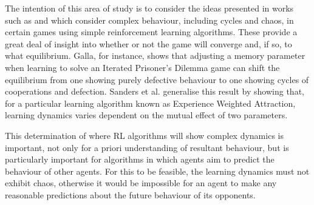 \documentclass[../sample.tex]{subfiles}
\begin{document}
    The intention of this area of study is to consider the ideas presented in works such as 
    \cite{Sanders2018} and \cite{Galla2011} which consider complex behaviour, including cycles and
    chaos, in certain games using simple reinforcement learning algorithms. These provide a great
    deal of insight into whether or not the game will converge and, if so, to what equilibrium.
    Galla, for instance, shows that adjusting a memory parameter when learning to solve an Iterated
    Prisoner's Dilemma game can shift the equilibrium from one showing purely defective behaviour to
    one showing cycles of cooperations and defection. Sanders et al. generalise this result by
    showing that, for a particular learning algorithm known as Experience Weighted Attraction,
    learning dynamics varies dependent on the mutual effect of two parameters. 

    This determination of where RL algorithms will show complex dynamics is important, not only for
    a priori understanding of resultant behaviour, but is particularly important for algorithms in
    which agents aim to predict the behaviour of other agents. For this to be feasible, the learning
    dynamics must not exhibit chaos, otherwise it would be impossible for an agent to make any
    reasonable predictions about the future behaviour of its opponents. 
    
\end{document}
